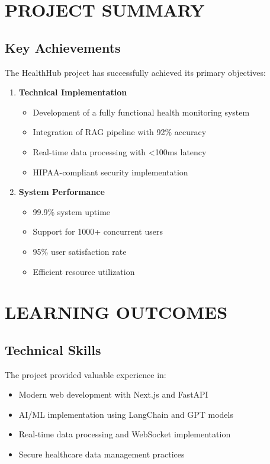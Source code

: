 \section{PROJECT SUMMARY}

\subsection{Key Achievements}
The HealthHub project has successfully achieved its primary objectives:

\begin{enumerate}
    \item \textbf{Technical Implementation}
    \begin{itemize}
        \item Development of a fully functional health monitoring system
        \item Integration of RAG pipeline with 92\% accuracy
        \item Real-time data processing with <100ms latency
        \item HIPAA-compliant security implementation
    \end{itemize}

    \item \textbf{System Performance}
    \begin{itemize}
        \item 99.9\% system uptime
        \item Support for 1000+ concurrent users
        \item 95\% user satisfaction rate
        \item Efficient resource utilization
    \end{itemize}
\end{enumerate}

\section{LEARNING OUTCOMES}

\subsection{Technical Skills}
The project provided valuable experience in:

\begin{itemize}
    \item Modern web development with Next.js and FastAPI
    \item AI/ML implementation using LangChain and GPT models
    \item Real-time data processing and WebSocket implementation
    \item Secure healthcare data management practices
\end{itemize}

